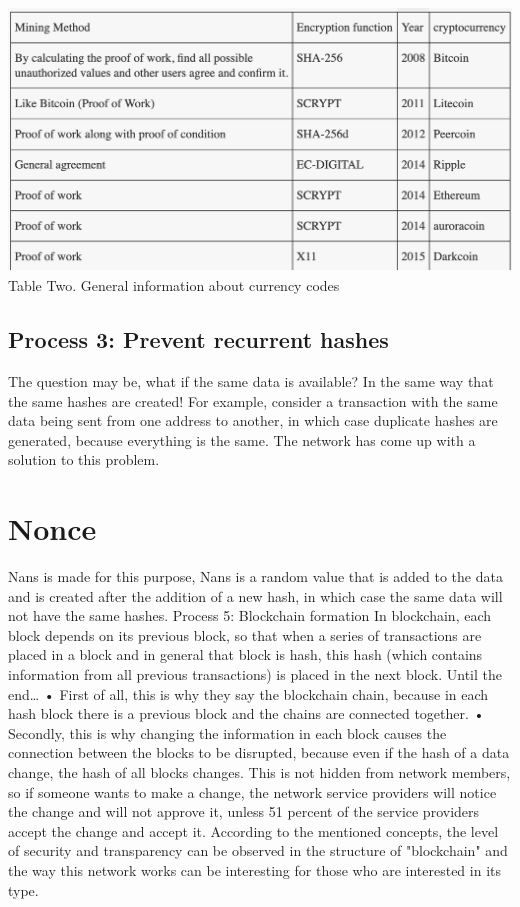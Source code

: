 \centering\includegraphics[width=15cm, height=7cm]{image/table2.png}
Table Two. General information about currency codes\textcite{tama2017critical}
\pagebreak
\begin{flushleft}
\subsection{Process 3: Prevent recurrent hashes}

The question may be, what if the same data is available? In the same way that the same hashes are created!
For example, consider a transaction with the same data being sent from one address to another, in which case duplicate hashes are generated, because everything is the same. The network has come up with a solution to this problem.
\section{Nonce}

Nans is made for this purpose, Nans is a random value that is added to the data and is created after the addition of a new hash, in which case the same data will not have the same hashes.
Process 5: Blockchain formation
In blockchain, each block depends on its previous block, so that when a series of transactions are placed in a block and in general that block is hash, this hash (which contains information from all previous transactions) is placed in the next block. Until the end…
• First of all, this is why they say the blockchain chain, because in each hash block there is a previous block and the chains are connected together.
• Secondly, this is why changing the information in each block causes the connection between the blocks to be disrupted, because even if the hash of a data change, the hash of all blocks changes.
This is not hidden from network members, so if someone wants to make a change, the network service providers will notice the change and will not approve it, unless 51 percent of the service providers accept the change and accept it.
According to the mentioned concepts, the level of security and transparency can be observed in the structure of "blockchain" and the way this network works can be interesting for those who are interested in its type.


\end{flushleft}
